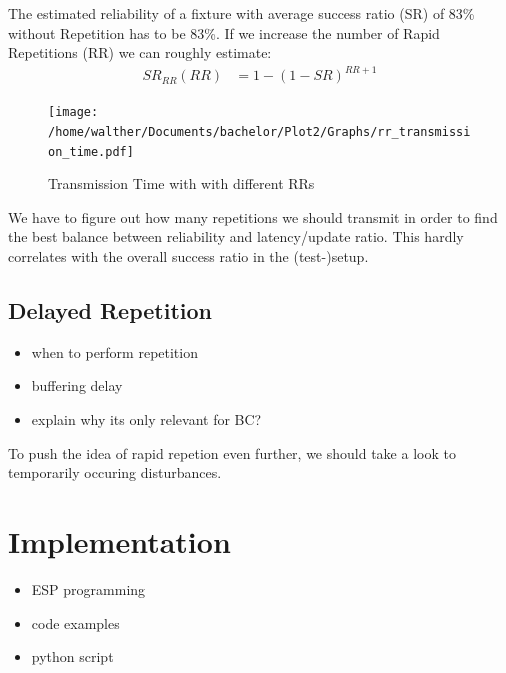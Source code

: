 \documentclass[]{ccs-thesis}
\begin{document}
The estimated reliability of a fixture with average success ratio (SR) of 83\% without Repetition has to be 83\%.
If we increase the number of Rapid Repetitions (RR) we can roughly estimate:
\begin{align}
	SR_{RR}(RR) &= 1-(1-SR)^{RR+1} 
\end{align}

\begin{figure}
	\centering
	\texttt{[image: /home/walther/Documents/bachelor/Plot2/Graphs/rr\_transmission\_time.pdf]}
	\caption{Transmission Time with with different \ac{RR}s}
	\label{fig:bc_analytic}
\end{figure}

We have to figure out how many repetitions we should transmit in order to find the best balance between reliability and latency/update ratio.
This hardly correlates with the overall success ratio in the (test-)setup. 

\subsection{Delayed Repetition}
\label{sub:DelayedRepetition}
\begin{itemize}
\item when to perform repetition
\item buffering delay
\item explain why its only relevant for BC?
\end{itemize}

To push the idea of rapid repetion even further, we should take a look to temporarily occuring disturbances.

\section{Implementation}
\begin{itemize}
\item ESP programming
\item code examples
\item python script
\end{itemize}
\end{document}
